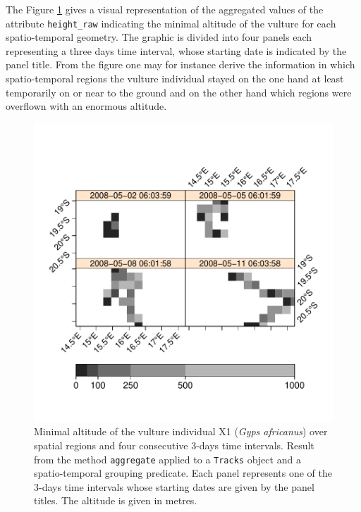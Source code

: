 \documentclass[12pt, oneside, a4paper]{scrbook}
\let\code=\texttt
\begin{document}
The Figure \ref{fig:aggtracksx1overstf} gives a visual representation of the aggregated values of the attribute \code{height\_raw} indicating the minimal altitude of the vulture for each spatio-temporal geometry. The graphic is divided into four panels each representing a three days time interval, whose starting date is indicated by the panel title.
From the figure one may for instance derive the information in which spatio-temporal regions the vulture individual stayed on the one hand at least temporarily on or near to the ground and on the other hand which regions were overflown with an enormous altitude.
\par\medskip


\begin{figure}[!htb]
\centering
\includegraphics{trajagg-agg_stf_vulture_Tracks_X1_fig_1}
\caption[Minimal altitude of a vulture obtained by aggregation over spatio-temporal geometries.]{Minimal altitude of the vulture individual X1 (\textit{Gyps africanus}) over spatial regions and four consecutive 3-days time intervals. Result from the method \code{aggregate} applied to a \code{Tracks} object and a spatio-temporal grouping predicate. Each panel represents one of the 3-days time intervals whose starting dates are given by the panel titles. The altitude is given in metres.}
\label{fig:aggtracksx1overstf}
\end{figure}
\end{document}
